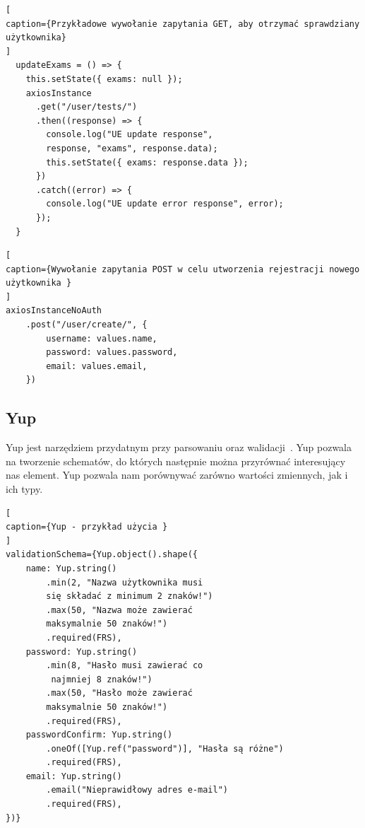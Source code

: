 \documentclass[oneside,polski,logo,indent]{amuthesis}
\begin{document}
\begin{lstlisting}[
caption={Przykładowe wywołanie zapytania GET, aby otrzymać sprawdziany użytkownika}
]
  updateExams = () => {
    this.setState({ exams: null });
    axiosInstance
      .get("/user/tests/")
      .then((response) => {
        console.log("UE update response",
        response, "exams", response.data);
        this.setState({ exams: response.data });
      })
      .catch((error) => {
        console.log("UE update error response", error);
      });
  }
\end{lstlisting}
\begin{lstlisting}[
caption={Wywołanie zapytania POST w celu utworzenia rejestracji nowego użytkownika }
]
axiosInstanceNoAuth
	.post("/user/create/", {
		username: values.name,
		password: values.password,
		email: values.email,
	})
\end{lstlisting}
\subsection{Yup}
Yup jest narzędziem przydatnym przy parsowaniu oraz walidacji~\cite{yup}. Yup pozwala na tworzenie schematów, do których następnie
można przyrównać interesujący nas element. Yup pozwala nam porównywać zarówno wartości zmiennych, jak i ich typy.
\begin{lstlisting}[
caption={Yup - przykład użycia }
]
validationSchema={Yup.object().shape({
	name: Yup.string()
		.min(2, "Nazwa użytkownika musi 
		się składać z minimum 2 znaków!")
		.max(50, "Nazwa może zawierać 
		maksymalnie 50 znaków!")
		.required(FRS),
	password: Yup.string()
		.min(8, "Hasło musi zawierać co
		 najmniej 8 znaków!")
		.max(50, "Hasło może zawierać 
		maksymalnie 50 znaków!")
		.required(FRS),
	passwordConfirm: Yup.string()
		.oneOf([Yup.ref("password")], "Hasła są różne")
		.required(FRS),
	email: Yup.string()
		.email("Nieprawidłowy adres e-mail")
		.required(FRS),
})}
\end{lstlisting}
\end{document}
